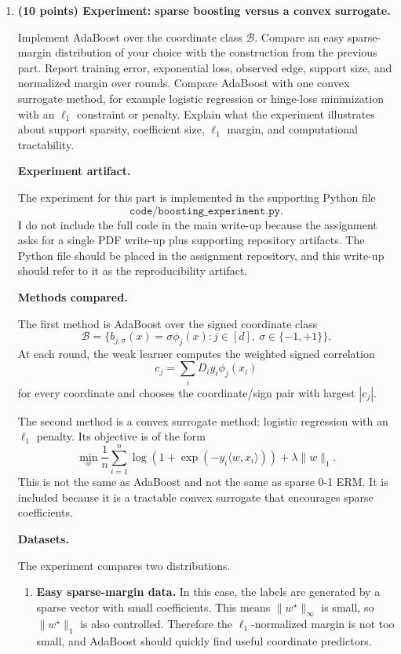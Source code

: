 \documentclass[11pt]{article}
\begin{document}
\begin{enumerate}
    \item \textbf{(10 points) Experiment: sparse boosting versus a convex surrogate.}

    Implement AdaBoost over the coordinate class $\mathcal B$. Compare an easy sparse-margin distribution of your choice with the construction from the previous part. Report training error, exponential loss, observed edge, support size, and normalized margin over rounds. Compare AdaBoost with one convex surrogate method, for example logistic regression or hinge-loss minimization with an $\ell_1$ constraint or penalty. Explain what the experiment illustrates about support sparsity, coefficient size, $\ell_1$ margin, and computational tractability.

    \begin{solutionbox}
    \textbf{Experiment artifact.}

    The experiment for this part is implemented in the supporting Python file
    \[
    \texttt{code/boosting\_experiment.py}.
    \]
    I do not include the full code in the main write-up because the assignment asks for a single
    PDF write-up plus supporting repository artifacts. The Python file should be placed in the
    assignment repository, and this write-up should refer to it as the reproducibility artifact.

    \medskip

    \textbf{Methods compared.}

    The first method is AdaBoost over the signed coordinate class
    \[
    \mathcal B=\{b_{j,\sigma}(x)=\sigma\phi_j(x):j\in[d],\ \sigma\in\{-1,+1\}\}.
    \]
    At each round, the weak learner computes the weighted signed correlation
    \[
    c_j=\sum_iD_i y_i\phi_j(x_i)
    \]
    for every coordinate and chooses the coordinate/sign pair with largest $|c_j|$.

    The second method is a convex surrogate method: logistic regression with an $\ell_1$ penalty.
    Its objective is of the form
    \[
    \min_w
    \frac1n\sum_{i=1}^n
    \log\left(1+\exp(-y_i\langle w,x_i\rangle)\right)
    +
    \lambda\|w\|_1.
    \]
    This is not the same as AdaBoost and not the same as sparse 0-1 ERM. It is included because
    it is a tractable convex surrogate that encourages sparse coefficients.

    \medskip

    \textbf{Datasets.}

    The experiment compares two distributions.

    \begin{enumerate}[leftmargin=2em]
        \item \textbf{Easy sparse-margin data.}
        In this case, the labels are generated by a sparse vector with small coefficients. This
        means $\|w^\star\|_\infty$ is small, so $\|w^\star\|_1$ is also controlled. Therefore the
        $\ell_1$-normalized margin is not too small, and AdaBoost should quickly find useful
        coordinate predictors.


\end{enumerate}
\end{solutionbox}
\end{enumerate}
\end{document}
